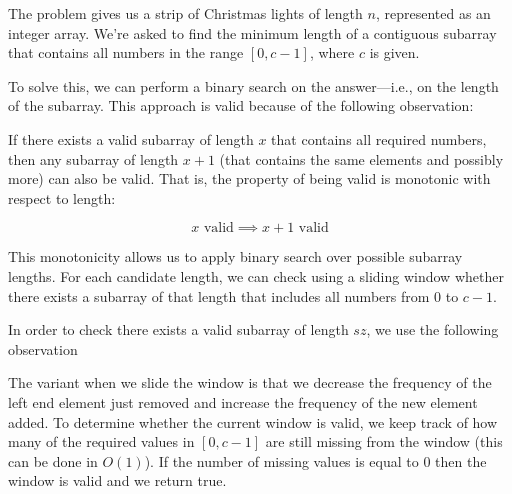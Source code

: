 The problem gives us a strip of Christmas lights of length $n$, represented as an integer array. We're asked to find the minimum length of a contiguous subarray that contains all numbers in the range $[0, c-1]$, where $c$ is given.

To solve this, we can perform a binary search on the answer—i.e., on the length of the subarray. This approach is valid because of the following observation:

If there exists a valid subarray of length $x$ that contains all required numbers, then any subarray of length $x+1$ (that contains the same elements and possibly more) can also be valid. That is, the property of being valid is monotonic with respect to length:

$$ x \text{ valid}  \implies x+1 \text{ valid} $$

This monotonicity allows us to apply binary search over possible subarray lengths. For each candidate length, we can check using a sliding window whether there exists a subarray of that length that includes all numbers from $0$ to $c-1$.

In order to check there exists a valid subarray of length $sz$, we use the following observation
\begin{obs}
    The variant when we slide the window is that we decrease the frequency of the left end element just removed and increase the frequency of the new element added. To determine whether the current window is valid, we keep track of how many of the required values in $[0, c - 1]$ are still missing from the window (this can be done in $O(1)$). If the number of missing values is equal to 0 then the window is valid and we return true.
\end{obs}

